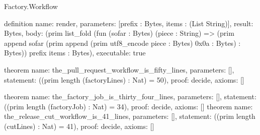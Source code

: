 \begin{lexlean}{Factory.Workflow}
\begin{semanticmodule}
definition{
  name: render,
  parameters: [prefix : Bytes, items : (List String)],
  result: Bytes,
  body: (prim list_fold (fun (sofar : Bytes) (piece : String) => (prim append sofar (prim append (prim utf8_encode piece : Bytes) 0x0a : Bytes) : Bytes)) prefix items : Bytes),
  executable: true
}

theorem{
  name: the_pull_request_workflow_is_fifty_lines,
  parameters: [],
  statement: ((prim length (factoryLines) : Nat) = 50),
  proof: decide{},
  axioms: []
}

theorem{
  name: the_factory_job_is_thirty_four_lines,
  parameters: [],
  statement: ((prim length (factoryJob) : Nat) = 34),
  proof: decide{},
  axioms: []
}
theorem{
  name: the_release_cut_workflow_is_41_lines,
  parameters: [],
  statement: ((prim length (cutLines) : Nat) = 41),
  proof: decide{},
  axioms: []
}
\end{semanticmodule}
\end{lexlean}
